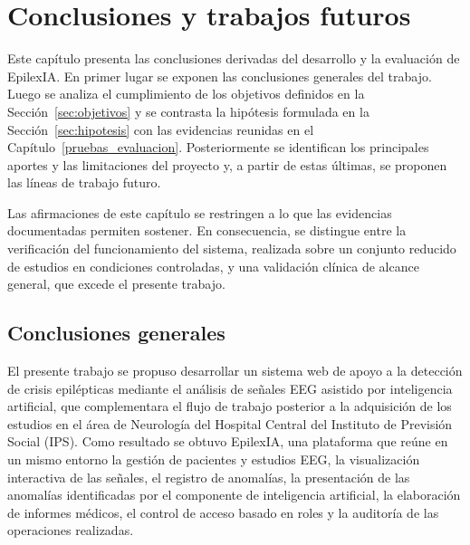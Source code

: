 \chapter{Conclusiones y trabajos futuros}
\label{chap:conclusiones}


Este capítulo presenta las conclusiones derivadas del desarrollo y la evaluación de EpilexIA.
En primer lugar se exponen las conclusiones generales del trabajo.
Luego se analiza el cumplimiento de los objetivos definidos en la Sección~\ref{sec:objetivos} y se contrasta la hipótesis formulada en la Sección~\ref{sec:hipotesis} con las evidencias reunidas en el Capítulo~\ref{pruebas_evaluacion}.
Posteriormente se identifican los principales aportes y las limitaciones del proyecto y, a partir de estas últimas, se proponen las líneas de trabajo futuro.

Las afirmaciones de este capítulo se restringen a lo que las evidencias documentadas permiten sostener.
En consecuencia, se distingue entre la verificación del funcionamiento del sistema, realizada sobre un conjunto reducido de estudios en condiciones controladas, y una validación clínica de alcance general, que excede el presente trabajo.


\section{Conclusiones generales}
\label{sec:conclusiones-generales}

El presente trabajo se propuso desarrollar un sistema web de apoyo a la detección de crisis epilépticas mediante el análisis de señales EEG asistido por inteligencia artificial, que complementara el flujo de trabajo posterior a la adquisición de los estudios en el área de Neurología del Hospital Central del Instituto de Previsión Social (IPS).
Como resultado se obtuvo EpilexIA, una plataforma que reúne en un mismo entorno la gestión de pacientes y estudios EEG, la visualización interactiva de las señales, el registro de anomalías, la presentación de las anomalías identificadas por el componente de inteligencia artificial, la elaboración de informes médicos, el control de acceso basado en roles y la auditoría de las operaciones realizadas.

